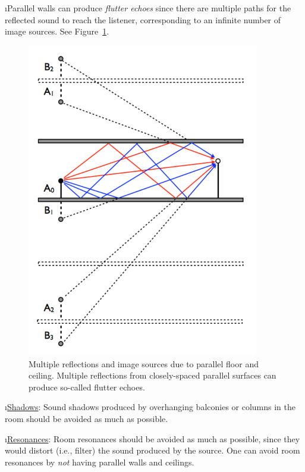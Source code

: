 \i Parallel walls can produce {\em flutter echoes}
since there are multiple paths for the reflected sound
to reach the listener, corresponding to an 
infinite number of image sources.
See Figure~\ref{f:reflections_parallel}. 
%
\begin{figure}[htbp]
\begin{center}
\includegraphics[width=0.9\textwidth]{reflections_parallel}
\caption{Multiple reflections and image sources due to 
parallel floor and ceiling.
Multiple reflections from closely-spaced parallel surfaces
can produce so-called flutter echoes.}
\label{f:reflections_parallel}
\end{center}
\end{figure}
%

\i \underline{Shadows}:
Sound shadows produced by overhanging balconies or columns
in the room should be avoided as much as possible.

\i \underline{Resonances}:
Room resonances should be avoided as much as possible,
since they would distort (i.e., filter) the sound 
produced by the source.
One can avoid room resonances by {\em not} having parallel walls 
and ceilings.

